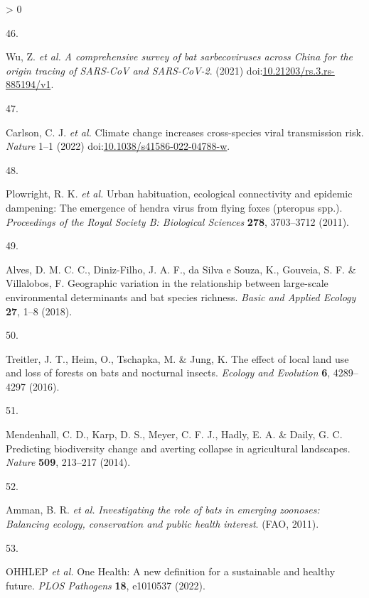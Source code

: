 \documentclass[10pt,oneside]{article}
\newlength{\cslhangindent}
\newlength{\csllabelwidth}
\newenvironment{CSLReferences}[3] %
 {%
  \setlength{\parindent}{0pt}
  \ifodd #1 \everypar{\setlength{\hangindent}{\cslhangindent}}\ignorespaces\fi
  \ifnum #2 > 0
  \setlength{\parskip}{#2\baselineskip}
  \fi
 }%
 {}
\newcommand{\CSLLeftMargin}[1]{\parbox[t]{\maxof{\widthof{#1}}{\csllabelwidth}}{#1}}
\newcommand{\CSLRightInline}[1]{\parbox[t]{\linewidth}{#1}}
\begin{document}
\begin{CSLReferences}{0}{0}
\leavevmode\hypertarget{ref-Wu2021Comprehensive}{}%
\CSLLeftMargin{46. }
\CSLRightInline{Wu, Z. \emph{et al.} \emph{A comprehensive survey of bat
sarbecoviruses across China for the origin tracing of SARS-CoV and
SARS-CoV-2}. (2021)
doi:\href{https://doi.org/10.21203/rs.3.rs-885194/v1}{10.21203/rs.3.rs-885194/v1}.}

\leavevmode\hypertarget{ref-Carlson2022Climate}{}%
\CSLLeftMargin{47. }
\CSLRightInline{Carlson, C. J. \emph{et al.} Climate change increases
cross-species viral transmission risk. \emph{Nature} 1--1 (2022)
doi:\href{https://doi.org/10.1038/s41586-022-04788-w}{10.1038/s41586-022-04788-w}.}

\leavevmode\hypertarget{ref-Plowright2011Urban}{}%
\CSLLeftMargin{48. }
\CSLRightInline{Plowright, R. K. \emph{et al.} Urban habituation,
ecological connectivity and epidemic dampening: The emergence of hendra
virus from flying foxes (pteropus spp.). \emph{Proceedings of the Royal
Society B: Biological Sciences} \textbf{278}, 3703--3712 (2011).}

\leavevmode\hypertarget{ref-Alves2018Geographic}{}%
\CSLLeftMargin{49. }
\CSLRightInline{Alves, D. M. C. C., Diniz-Filho, J. A. F., da Silva e
Souza, K., Gouveia, S. F. \& Villalobos, F. Geographic variation in the
relationship between large-scale environmental determinants and bat
species richness. \emph{Basic and Applied Ecology} \textbf{27}, 1--8
(2018).}

\leavevmode\hypertarget{ref-Treitler2016Effect}{}%
\CSLLeftMargin{50. }
\CSLRightInline{Treitler, J. T., Heim, O., Tschapka, M. \& Jung, K. The
effect of local land use and loss of forests on bats and nocturnal
insects. \emph{Ecology and Evolution} \textbf{6}, 4289--4297 (2016).}

\leavevmode\hypertarget{ref-Mendenhall2014Predictinga}{}%
\CSLLeftMargin{51. }
\CSLRightInline{Mendenhall, C. D., Karp, D. S., Meyer, C. F. J., Hadly,
E. A. \& Daily, G. C. Predicting biodiversity change and averting
collapse in agricultural landscapes. \emph{Nature} \textbf{509},
213--217 (2014).}

\leavevmode\hypertarget{ref-Amman2011Investigating}{}%
\CSLLeftMargin{52. }
\CSLRightInline{Amman, B. R. \emph{et al.} \emph{Investigating the role
of bats in emerging zoonoses: Balancing ecology, conservation and public
health interest}. (FAO, 2011).}

\leavevmode\hypertarget{ref-OHHLEP2022One}{}%
\CSLLeftMargin{53. }
\CSLRightInline{OHHLEP \emph{et al.} One Health: A new definition for a
sustainable and healthy future. \emph{PLOS Pathogens} \textbf{18},
e1010537 (2022).}


\end{CSLReferences}
\end{document}
